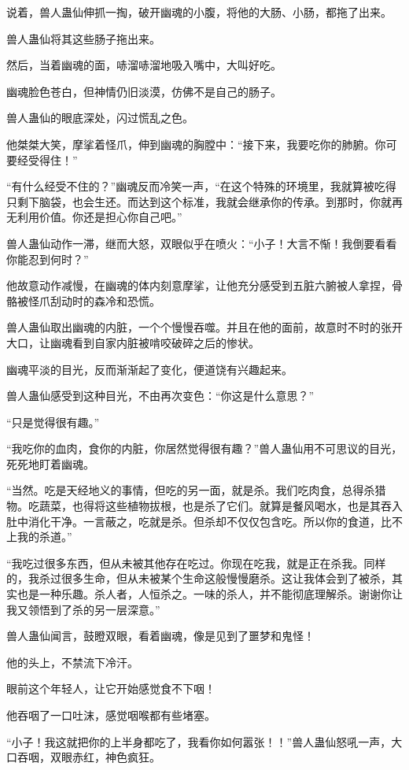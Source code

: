 \begin{this_body}
说着，兽人蛊仙伸抓一掏，破开幽魂的小腹，将他的大肠、小肠，都拖了出来。

兽人蛊仙将其这些肠子拖出来。

然后，当着幽魂的面，哧溜哧溜地吸入嘴中，大叫好吃。

幽魂脸色苍白，但神情仍旧淡漠，仿佛不是自己的肠子。

兽人蛊仙的眼底深处，闪过慌乱之色。

他桀桀大笑，摩挲着怪爪，伸到幽魂的胸膛中：“接下来，我要吃你的肺腑。你可要经受得住！”

“有什么经受不住的？”幽魂反而冷笑一声，“在这个特殊的环境里，我就算被吃得只剩下脑袋，也会生还。而达到这个标准，我就会继承你的传承。到那时，你就再无利用价值。你还是担心你自己吧。”

兽人蛊仙动作一滞，继而大怒，双眼似乎在喷火：“小子！大言不惭！我倒要看看你能忍到何时？”

他故意动作减慢，在幽魂的体内刻意摩挲，让他充分感受到五脏六腑被人拿捏，骨骼被怪爪刮动时的森冷和恐慌。

兽人蛊仙取出幽魂的内脏，一个个慢慢吞噬。并且在他的面前，故意时不时的张开大口，让幽魂看到自家内脏被啃咬破碎之后的惨状。

幽魂平淡的目光，反而渐渐起了变化，便道饶有兴趣起来。

兽人蛊仙感受到这种目光，不由再次变色：“你这是什么意思？”

“只是觉得很有趣。”

“我吃你的血肉，食你的内脏，你居然觉得很有趣？”兽人蛊仙用不可思议的目光，死死地盯着幽魂。

“当然。吃是天经地义的事情，但吃的另一面，就是杀。我们吃肉食，总得杀猎物。吃蔬菜，也得将这些植物拔根，也是杀了它们。就算是餐风喝水，也是其吞入肚中消化干净。一言蔽之，吃就是杀。但杀却不仅仅包含吃。所以你的食道，比不上我的杀道。”

“我吃过很多东西，但从未被其他存在吃过。你现在吃我，就是正在杀我。同样的，我杀过很多生命，但从未被某个生命这般慢慢磨杀。这让我体会到了被杀，其实也是一种乐趣。杀人者，人恒杀之。一味的杀人，并不能彻底理解杀。谢谢你让我又领悟到了杀的另一层深意。”

兽人蛊仙闻言，鼓瞪双眼，看着幽魂，像是见到了噩梦和鬼怪！

他的头上，不禁流下冷汗。

眼前这个年轻人，让它开始感觉食不下咽！

他吞咽了一口吐沫，感觉咽喉都有些堵塞。

“小子！我这就把你的上半身都吃了，我看你如何嚣张！！”兽人蛊仙怒吼一声，大口吞咽，双眼赤红，神色疯狂。


\end{this_body}
